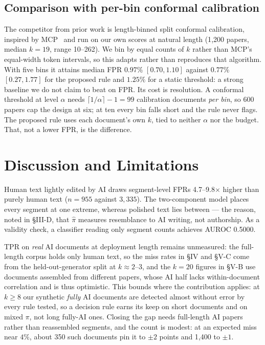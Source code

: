 \documentclass[10pt,conference,a4paper]{IEEEtran}
\newcommand{\sect}[1]{\S#1}
\begin{document}
\subsection{Comparison with per-bin conformal calibration}
The competitor from prior work is length-binned split conformal calibration, inspired
by MCP~\cite{mcp2025acl} and run on our own scores at natural length (1{,}200 papers,
median $k=19$, range 10--262). We bin by equal counts of $k$ rather than MCP's
equal-width token intervals, so this adapts rather than reproduces that algorithm. With
five bins it attains median FPR $0.97\%$ $[0.70,1.10]$ against $0.77\%$ $[0.27,1.77]$
for the proposed rule and $1.25\%$ for a static threshold: a strong baseline we do not
claim to beat on FPR. Its cost is resolution. A conformal threshold at level $\alpha$
needs $\lceil 1/\alpha\rceil-1=99$ calibration documents \emph{per bin}, so 600 papers
cap the design at six; at ten every bin falls short and the rule never flags. The
proposed rule uses each document's own $k$, tied to neither $\alpha$ nor the budget.
That, not a lower FPR, is the difference.

\section{Discussion and Limitations}
Human text lightly edited by AI draws segment-level FPRs 4.7--9.8$\times$ higher than
purely human text ($n{=}955$ against $3{,}335$). The two-component model places every
segment at one extreme, whereas polished text lies between --- the reason, noted in
\sect{III-D}, that $\hat{\pi}$ measures resemblance to AI writing, not authorship. As a validity check, a
classifier reading only segment counts achieves AUROC 0.5000.

TPR on \emph{real} AI documents at deployment length remains unmeasured: the full-length
corpus holds only human text, so the miss rates in \sect{IV} and \sect{V-C} come from
the held-out-generator split at $k\approx2$--3, and the $k{=}20$ figures in \sect{V-B}
use documents assembled from different papers, whose AI half lacks within-document
correlation and is thus optimistic. This bounds where the
contribution applies: at $k\ge8$ our synthetic \emph{fully} AI documents are detected
almost without error by every rule tested, so a decision rule earns its keep on short
documents and on mixed $\pi$, not long fully-AI ones. Closing the gap needs full-length
AI papers rather than reassembled segments, and the count is modest: at an expected
miss near $4\%$, about 350 such documents pin it to $\pm2$ points and 1{,}400 to
$\pm1$.
\end{document}
